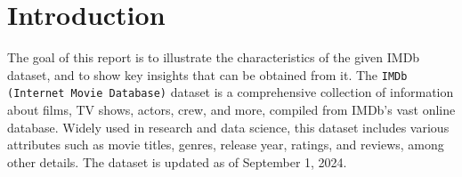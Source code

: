 \section{Introduction}
The goal of this report is to illustrate the characteristics of the
given IMDb dataset, and to show key insights that can be
obtained from it.
The \texttt{IMDb (Internet Movie Database)} 
dataset is a comprehensive collection of information about films, TV shows, actors, crew, 
and more, compiled from IMDb's vast online database. Widely used in research and data science, 
this dataset includes various attributes such as movie titles, genres, release year, ratings, 
and reviews, among other details. The dataset is updated as of September 1, 2024.
